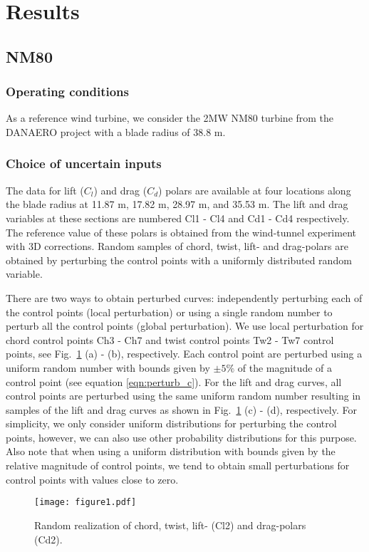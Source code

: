 \section{Results}\label{sec:results}

\subsection{NM80}
\subsubsection{Operating conditions}
As a reference wind turbine, we consider the 2MW NM80 turbine from the DANAERO project \cite{Troldborg2013} with a blade radius of 38.8 m. 

\subsubsection{Choice of uncertain inputs}
The data for lift ($C_l$) and drag ($C_d$) polars are available at four locations along the blade radius at 11.87 m, 17.82 m, 28.97 m, and 35.53 m. The lift and drag variables at these sections are numbered Cl1 - Cl4 and Cd1 - Cd4 respectively. The reference value of these polars is obtained from the wind-tunnel experiment with 3D corrections. Random samples of chord, twist, lift- and drag-polars are obtained by perturbing the control points with a uniformly distributed random variable.  

There are two ways to obtain perturbed curves: independently perturbing each of the control points (local perturbation) or using a single random number to perturb all the control points (global perturbation). We use local perturbation for chord control points Ch3 - Ch7 and twist control points Tw2 - Tw7 control points, see Fig.\ \ref{perturbed_samples} (a) - (b), respectively. Each control point are perturbed using a uniform random number with bounds given by $\pm5\%$ of the magnitude of a control point (see equation \eqref{eqn:perturb_c}). For the lift and drag curves, all control points are perturbed using the same uniform random number resulting in samples of the lift and drag curves as shown in Fig.\ \ref{perturbed_samples} (c) - (d), respectively. For simplicity, we only consider uniform distributions for perturbing the control points, however, we can also use other probability distributions for this purpose. Also note that when using a uniform distribution with bounds given by the relative magnitude of control points, we tend to obtain small perturbations for control points with values close to zero. 
\begin{figure}[h!]
\centering
\texttt{[image: figure1.pdf]}
\caption{Random realization of chord, twist, lift- (Cl2) and drag-polars (Cd2).}
\label{perturbed_samples}
\end{figure}

